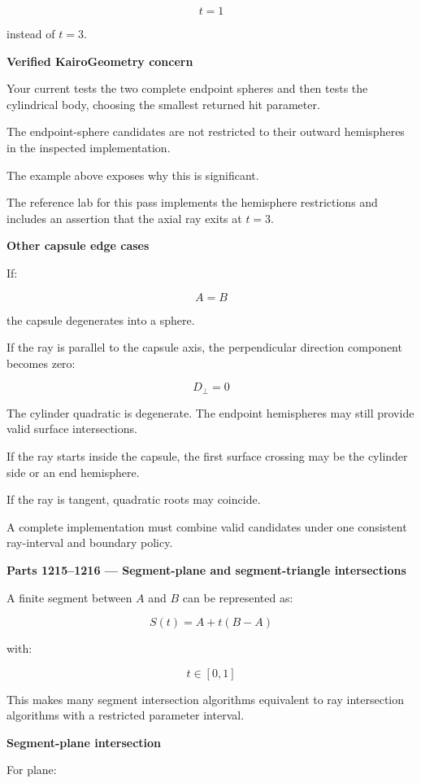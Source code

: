 \[
t=1
\]

instead of \(t=3\).

\textbf{Verified KairoGeometry concern}

Your current  tests the two complete endpoint spheres and then tests the cylindrical body, choosing the smallest returned hit parameter.

The endpoint-sphere candidates are not restricted to their outward hemispheres in the inspected implementation.

The example above exposes why this is significant.

The reference lab for this pass implements the hemisphere restrictions and includes an assertion that the axial ray exits at \(t=3\).

\textbf{Other capsule edge cases}

If:

\[
A=B
\]

the capsule degenerates into a sphere.

If the ray is parallel to the capsule axis, the perpendicular direction component becomes zero:

\[
D_\perp=0
\]

The cylinder quadratic is degenerate. The endpoint hemispheres may still provide valid surface intersections.

If the ray starts inside the capsule, the first surface crossing may be the cylinder side or an end hemisphere.

If the ray is tangent, quadratic roots may coincide.

A complete implementation must combine valid candidates under one consistent ray-interval and boundary policy.

\textbf{Parts 1215--1216 --- Segment-plane and segment-triangle intersections}

A finite segment between \(A\) and \(B\) can be represented as:

\[
S(t)=A+t(B-A)
\]

with:

\[
\boxed{t\in[0,1]}
\]

This makes many segment intersection algorithms equivalent to ray intersection algorithms with a restricted parameter interval.

\textbf{Segment-plane intersection}

For plane:

